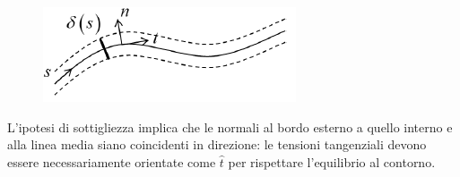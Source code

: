 \begin{figure}[H]
	\centering
	\label{fig:screenshot012}
	\includegraphics[width=0.5\linewidth]{immagini_5/screenshot012}
\end{figure}
		
		L’ipotesi di sottigliezza implica che le normali al bordo esterno a quello interno e alla linea media siano coincidenti
		in direzione: le tensioni tangenziali devono essere necessariamente orientate come $\hat{t}$ per rispettare l’equilibrio al
		contorno. \newline 
		
